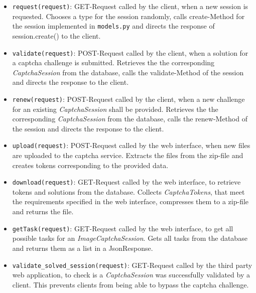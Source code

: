 \begin{itemize}
\item \verb|request(request)|: GET-Request called by the client, when a new session is requested. Chooses a type for the session randomly, calls create-Method for the session implemented in \verb|models.py| and directs the response of session.create() to the client.
\item \verb|validate(request)|: POST-Request called by the client, when a solution for a captcha challenge is submitted. Retrieves the the corresponding \emph{CaptchaSession} from the database, calls the validate-Method of the session and directs the response to the client.
\item \verb|renew(request)|: POST-Request called by the client, when a new challenge for an existing \emph{CaptchaSession} shall be provided. Retrieves the the corresponding \emph{CaptchaSession} from the database, calls the renew-Method of the session and directs the response to the client.
\item \verb|upload(request)|: POST-Request called by the web interface, when new files are uploaded to the captcha service. Extracts the files from the zip-file and creates tokens corresponding to the provided data.
\item \verb|download(request)|: GET-Request called by the web interface, to retrieve tokens and solutions from the database. Collects \emph{CaptchaTokens}, that meet the requirements specified in the web interface, compresses them to a zip-file and returns the file.
\item \verb|getTask(request)|: GET-Request called by the web interface, to get all possible tasks for an \emph{ImageCaptchaSession}. Gets all tasks from the database and returns them as a list in a JsonResponse.
\item \verb|validate_solved_session(request)|: GET-Request called by the third party web application, to check is a \emph{CaptchaSession} was successfully validated by a client. This prevents clients from being able to bypass the captcha challenge.
\end{itemize}


\clearpage


